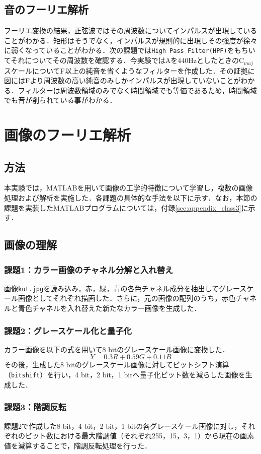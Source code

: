 \documentclass[paper=a4, fontsize=10pt]{jlreq}
\begin{document}
\subsection{音のフーリエ解析}
フーリエ変換の結果，正弦波ではその周波数についてインパルスが出現していることがわかる．矩形はそうでなく，インパルスが規則的に出現しその強度が徐々に弱くなっていることがわかる．次の課題では\verb|High Pass Filter(HPF)|をもちいてそれについてその周波数を確認する．今実験ではAを$440$HzとしたときのC$_{maj}$スケールについてF以上の純音を省くようなフィルターを作成した．その証拠に図にはFより周波数の高い純音のみしかインパルスが出現していないことがわかる．フィルターは周波数領域のみでなく時間領域でも等価であるため，時間領域でも音が削られている事がわかる．

\section{画像のフーリエ解析}
\subsection*{方法}
本実験では，MATLABを用いて画像の工学的特徴について学習し，複数の画像処理および解析を実施した．各課題の具体的な手法を以下に示す．なお，本節の課題を実装したMATLABプログラムについては，付録\ref{sec:appendix_class3}に示す．
\subsection{画像の理解}

\subsubsection{課題1：カラー画像のチャネル分解と入れ替え}
画像\texttt{kut.jpg}を読み込み，赤，緑，青の各色チャネル成分を抽出してグレースケール画像としてそれぞれ描画した．さらに，元の画像の配列のうち，赤色チャネルと青色チャネルを入れ替えた新たなカラー画像を生成した．

\subsubsection{課題2：グレースケール化と量子化}
カラー画像を以下の式を用いて8 bitのグレースケール画像に変換した．
$$Y = 0.3R + 0.59G + 0.11B$$
その後，生成した8 bitのグレースケール画像に対してビットシフト演算（\texttt{bitshift}）を行い，4 bit，2 bit，1 bitへ量子化ビット数を減らした画像を生成した．

\subsubsection{課題3：階調反転}
課題2で作成した8 bit，4 bit，2 bit，1 bitの各グレースケール画像に対し，それぞれのビット数における最大階調値（それぞれ255，15，3，1）から現在の画素値を減算することで，階調反転処理を行った．
\end{document}
